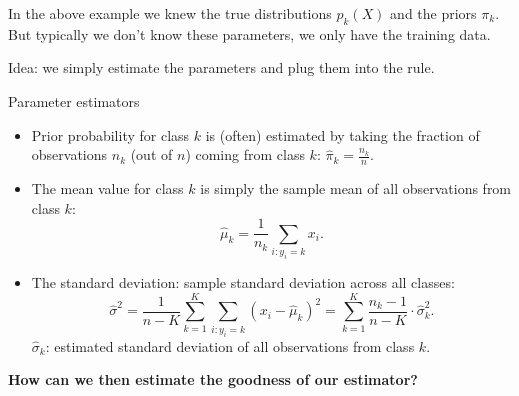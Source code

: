 \documentclass[10pt,ignorenonframetext,]{beamer}
\begin{document}
\begin{frame}

\vspace{2mm}

In the above example we knew the true distributions \(p_k(X)\) and the
priors \(\pi_k\). But typically we don't know these parameters, we only
have the training data.

Idea: we simply estimate the parameters and plug them into the rule.

\end{frame}

\begin{frame}

\begin{block}{Parameter estimators}

\vspace{2mm}

\begin{itemize}
\item
  Prior probability for class \(k\) is (often) estimated by taking the
  fraction of observations \(n_k\) (out of \(n\)) coming from class
  \(k\): \(\hat{\pi}_k = \frac{n_k}{n}.\)
\item
  The mean value for class \(k\) is simply the sample mean of all
  observations from class \(k\):
  \[\hat{\mu}_k = \frac{1}{n_k}\sum_{i:y_i=k} x_i.\]
\item
  The standard deviation: sample standard deviation across all classes:
  \[\hat{\sigma}^2=\frac{1}{n-K}\sum_{k=1}^K \sum_{i: y_i=k} (x_i-\hat{\mu}_k)^2 = \sum_{k=1}^K \frac{n_k - 1}{n - K} \cdot \hat{\sigma}_k^2.\]
  \(\hat{\sigma}_k\): estimated standard deviation of all observations
  from class \(k\).
\end{itemize}

\textbf{How can we then estimate the goodness of our estimator?}

\end{block}

\end{frame}
\end{document}
